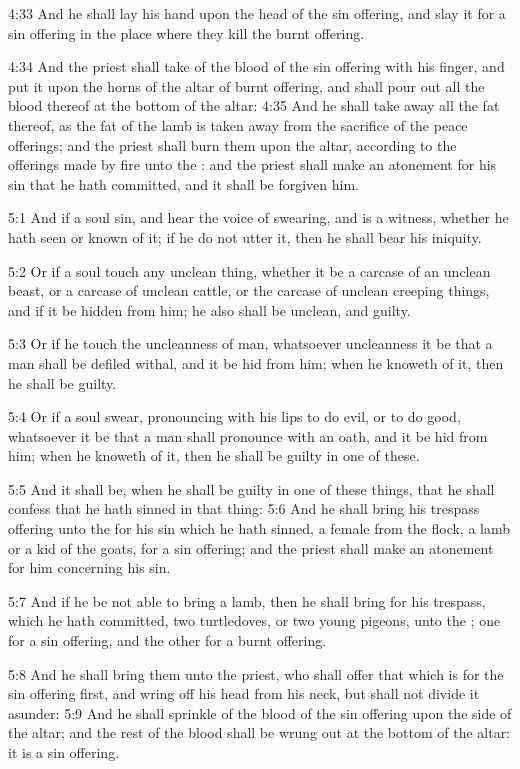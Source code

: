 4:33 And he shall lay his hand upon the head of the sin offering, and slay it for a sin offering in the place where they kill the burnt offering.

4:34 And the priest shall take of the blood of the sin offering with his finger, and put it upon the horns of the altar of burnt offering, and shall pour out all the blood thereof at the bottom of the altar: 4:35 And he shall take away all the fat thereof, as the fat of the lamb is taken away from the sacrifice of the peace offerings; and the priest shall burn them upon the altar, according to the offerings made by fire unto the \LORD: and the priest shall make an atonement for his sin that he hath committed, and it shall be forgiven him.

5:1 And if a soul sin, and hear the voice of swearing, and is a witness, whether he hath seen or known of it; if he do not utter it, then he shall bear his iniquity.

5:2 Or if a soul touch any unclean thing, whether it be a carcase of an unclean beast, or a carcase of unclean cattle, or the carcase of unclean creeping things, and if it be hidden from him; he also shall be unclean, and guilty.

5:3 Or if he touch the uncleanness of man, whatsoever uncleanness it be that a man shall be defiled withal, and it be hid from him; when he knoweth of it, then he shall be guilty.

5:4 Or if a soul swear, pronouncing with his lips to do evil, or to do good, whatsoever it be that a man shall pronounce with an oath, and it be hid from him; when he knoweth of it, then he shall be guilty in one of these.

5:5 And it shall be, when he shall be guilty in one of these things, that he shall confess that he hath sinned in that thing: 5:6 And he shall bring his trespass offering unto the \LORD for his sin which he hath sinned, a female from the flock, a lamb or a kid of the goats, for a sin offering; and the priest shall make an atonement for him concerning his sin.

5:7 And if he be not able to bring a lamb, then he shall bring for his trespass, which he hath committed, two turtledoves, or two young pigeons, unto the \LORD; one for a sin offering, and the other for a burnt offering.

5:8 And he shall bring them unto the priest, who shall offer that which is for the sin offering first, and wring off his head from his neck, but shall not divide it asunder: 5:9 And he shall sprinkle of the blood of the sin offering upon the side of the altar; and the rest of the blood shall be wrung out at the bottom of the altar: it is a sin offering.

